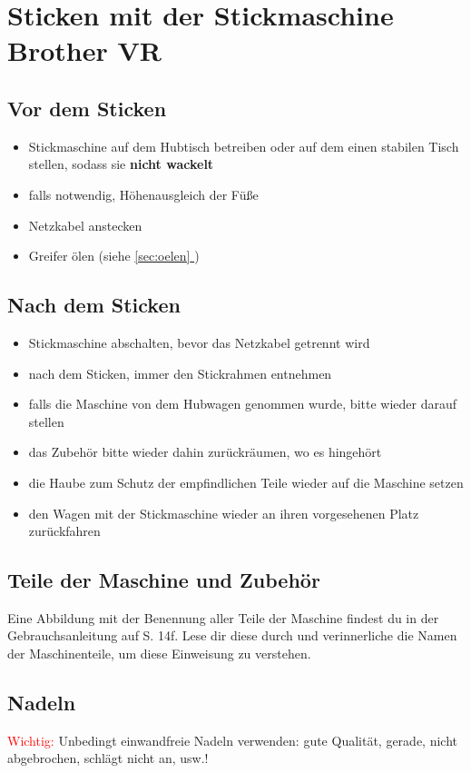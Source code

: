 \documentclass{\basedir/fablab-document}
\newcommand*{\fullref}[1]{\hyperref[{#1}]{\autoref*{#1} \nameref*{#1}}}
\begin{document}
\section{Sticken mit der Stickmaschine Brother VR}

\subsection{Vor dem Sticken}
\begin{itemize}
	\item Stickmaschine auf dem Hubtisch betreiben oder auf dem einen stabilen Tisch stellen, sodass sie \textbf{nicht wackelt}
	\item falls notwendig, Höhenausgleich der Füße
	\item Netzkabel anstecken
	\item Greifer ölen (siehe \fullref{sec:oelen})
\end{itemize}

\subsection{Nach dem Sticken}
\begin{itemize}
	\item Stickmaschine abschalten, bevor das Netzkabel getrennt wird
	\item nach dem Sticken, immer den Stickrahmen entnehmen
	\item falls die Maschine von dem Hubwagen genommen wurde, bitte wieder darauf stellen
	\item das Zubehör bitte wieder dahin zurückräumen, wo es hingehört
	\item die Haube zum Schutz der empfindlichen Teile wieder auf die Maschine setzen
	\item den Wagen mit der Stickmaschine wieder an ihren vorgesehenen Platz zurückfahren
\end{itemize}

\subsection{Teile der Maschine und Zubehör}

Eine Abbildung mit der Benennung aller Teile der Maschine findest du in der Gebrauchsanleitung auf S. 14f. Lese dir diese durch und verinnerliche die Namen der Maschinenteile, um diese Einweisung zu verstehen.


\subsection{Nadeln}
\textcolor{red}{Wichtig:} Unbedingt einwandfreie Nadeln verwenden: gute Qualität, gerade, nicht abgebrochen, schlägt nicht an, usw.!
\end{document}
